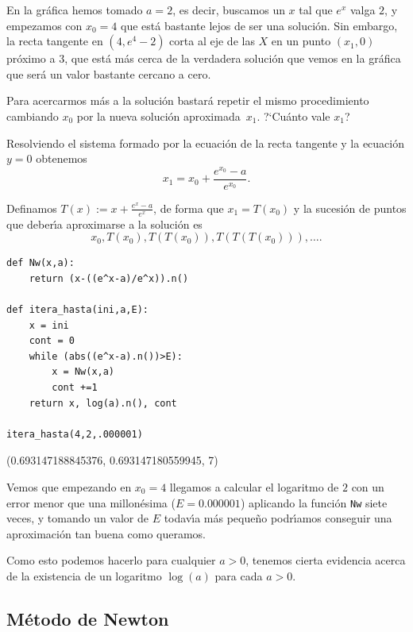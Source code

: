 En la gr\'afica hemos tomado $a=2$, es decir, buscamos un $x$ tal que $e^x$
valga $2$, y empezamos con $x_0=4$ que est\'a bastante lejos de ser una
soluci\'on.  Sin embargo, la recta tangente en $(4,e^4-2)$ corta al eje de las
$X$ en un punto $(x_1,0)$ pr\'oximo a $3$,  que est\'a m\'as cerca de la
verdadera soluci\'on que vemos en la gr\'afica que ser\'a un valor bastante
cercano a cero. 


Para acercarmos m\'as a la soluci\'on bastar\'a repetir el mismo procedimiento
cambiando $x_0$ por la nueva soluci\'on aproximada~$x_1$. ?`Cu\'anto vale $x_1$?

Resolviendo el sistema formado por la ecuaci\'on de la recta tangente y la
ecuaci\'on $y=0$ obtenemos
\[x_1=x_0+\frac{e^{x_0}-a}{e^{x_0}}.\]

Definamos $T(x):= x+\frac{e^{x}-a}{e^x}$, de forma que $x_1=T(x_0)$ y la
sucesi\'on de puntos que deber\'{\i}a aproximarse a la soluci\'on es 
\[x_0,T(x_0),T(T(x_0)),T(T(T(x_0))),\dots.\]

\begin{lstlisting}[title=Método de Newton]
def Nw(x,a):
    return (x-((e^x-a)/e^x)).n()
    
def itera_hasta(ini,a,E):
    x = ini
    cont = 0
    while (abs((e^x-a).n())>E):
        x = Nw(x,a)
        cont +=1
    return x, log(a).n(), cont
    
itera_hasta(4,2,.000001)
\end{lstlisting}
\begin{Output}
	(0.693147188845376, 0.693147180559945, 7)
\end{Output}

% 
% 


Vemos que empezando en $x_0=4$ llegamos a calcular el logaritmo de $2$ con un
error menor que una millon\'esima ($E=0{.}000001$) aplicando la funci\'on
\lstinline$Nw$
siete veces,  y  tomando un valor de $E$ todav\'{\i}a m\'as peque\~no
podr\'{\i}amos conseguir una aproximaci\'on tan buena como queramos. 


Como esto podemos hacerlo para cualquier $a>0$, tenemos cierta evidencia acerca
de la existencia de un logaritmo $\log(a)$ para cada $a>0$. 


\subsection{M\'etodo de Newton}

